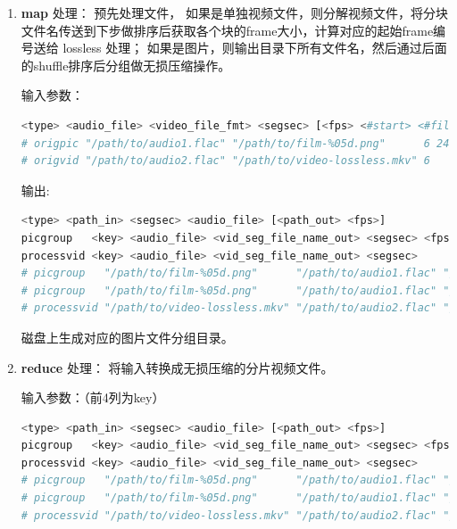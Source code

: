 \begin{enumerate}
  \item \textbf{map}
处理：
预先处理文件，
如果是单独视频文件，则分解视频文件，将分块文件名传送到下步做排序后获取各个块的frame大小，计算对应的起始frame编号送给 lossless 处理；
如果是图片，则输出目录下所有文件名，然后通过后面的shuffle排序后分组做无损压缩操作。


输入参数：
\begin{lstlisting}[language=bash]
<type> <audio_file> <video_file_fmt> <segsec> [<fps> <#start> <#files>]
# origpic "/path/to/audio1.flac" "/path/to/film-%05d.png"      6 24 1 1253
# origvid "/path/to/audio2.flac" "/path/to/video-lossless.mkv" 6
\end{lstlisting}


输出:
\begin{lstlisting}[language=bash]
<type> <path_in> <segsec> <audio_file> [<path_out> <fps>]
picgroup   <key> <audio_file> <vid_seg_file_name_out> <segsec> <fps> <frame_start_number>
processvid <key> <audio_file> <vid_seg_file_name_out> <segsec>
# picgroup   "/path/to/film-%05d.png"      "/path/to/audio1.flac" "/path/to/tmp/video-0000000000000000000.lossless.mkv" 6 24 0
# picgroup   "/path/to/film-%05d.png"      "/path/to/audio1.flac" "/path/to/tmp/video-0000000000000000001.lossless.mkv" 6 24 144
# processvid "/path/to/video-lossless.mkv" "/path/to/audio2.flac" "/path/to/tmp/video-0000000000000000001.lossless.mkv" 6
\end{lstlisting}

磁盘上生成对应的图片文件分组目录。

  \item \textbf{reduce}
处理：
将输入转换成无损压缩的分片视频文件。


输入参数：（前4列为key）
\begin{lstlisting}[language=bash]
<type> <path_in> <segsec> <audio_file> [<path_out> <fps>]
picgroup   <key> <audio_file> <vid_seg_file_name_out> <segsec> <fps> <frame_start_number>
processvid <key> <audio_file> <vid_seg_file_name_out> <segsec>
# picgroup   "/path/to/film-%05d.png"      "/path/to/audio1.flac" "/path/to/tmp/video-0000000000000000000.lossless.mkv" 6 24 0
# picgroup   "/path/to/film-%05d.png"      "/path/to/audio1.flac" "/path/to/tmp/video-0000000000000000001.lossless.mkv" 6 24 144
# processvid "/path/to/video-lossless.mkv" "/path/to/audio2.flac" "/path/to/tmp/video-0000000000000000001.lossless.mkv" 6
\end{lstlisting}


\end{enumerate}
